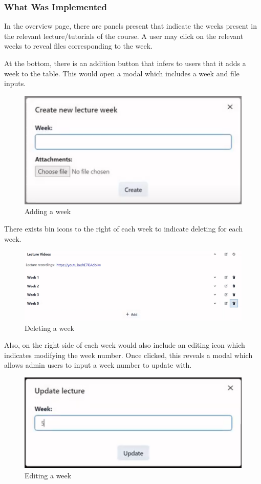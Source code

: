 \subsubsection{What Was Implemented}
In the overview page, there are panels present that indicate the weeks present in the relevant lecture/tutorials of the course. A user may click on the relevant weeks to reveal files corresponding to the week.

At the bottom, there is an addition button that infers to users that it adds a week to the table. This would open a modal which includes a week and file inputs. 

\begin{figure}[h!]
    \includegraphics[scale=0.3]{images/lat-add-week.png}
    \centering
    \caption{Adding a week}
\end{figure}

There exists bin icons to the right of each week to indicate deleting for each week. 

\begin{figure}[h!]
    \includegraphics[scale=0.3]{images/lat-delete-week.png}
    \centering
    \caption{Deleting a week}
\end{figure}

Also, on the right side of each week would also include an editing icon which indicates modifying the week number. Once clicked, this reveals a modal which allows admin users to input a week number to update with.

\begin{figure}[h!]
    \includegraphics[scale=0.3]{images/lat-update-week.png}
    \centering
    \caption{Editing a week}
\end{figure}

